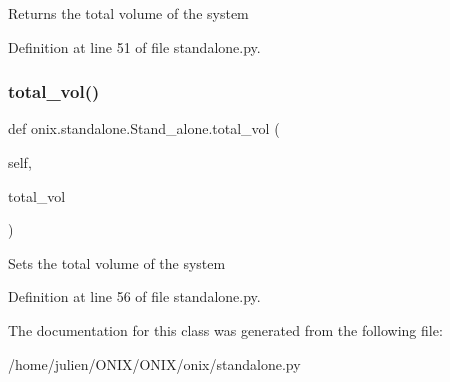 \begin{DoxyVerb}Returns the total volume of the system\end{DoxyVerb}
 

Definition at line 51 of file standalone.\+py.

\mbox{\label{classonix_1_1standalone_1_1Stand__alone_aca9f0c220bb80f44b3731a6580fc38fa}} 
\subsubsection{\texorpdfstring{total\+\_\+vol()}{total\_vol()}\hspace{0.1cm}{\footnotesize\ttfamily [2/2]}}
{\footnotesize\ttfamily def onix.\+standalone.\+Stand\+\_\+alone.\+total\+\_\+vol (\begin{DoxyParamCaption}\item[{}]{self,  }\item[{}]{total\+\_\+vol }\end{DoxyParamCaption})}

\begin{DoxyVerb}Sets the total volume of the system\end{DoxyVerb}
 

Definition at line 56 of file standalone.\+py.



The documentation for this class was generated from the following file\+:\begin{DoxyCompactItemize}
\item 
/home/julien/\+O\+N\+I\+X/\+O\+N\+I\+X/onix/standalone.\+py\end{DoxyCompactItemize}
